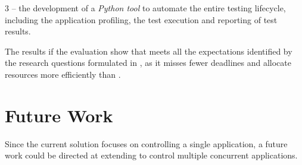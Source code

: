 3 -- the development of a \textit{Python tool} to automate the entire testing lifecycle, including the application profiling, the test execution and reporting of test results. 

The results if the evaluation show that \tool meets all the expectations identified by the research questions formulated in , as it misses fewer deadlines and allocate resources more efficiently than \cSpark. 

\section{Future Work}\label{sec:future_work}
 
Since the current solution focuses on controlling a single application, a future work could be directed at extending \tool to control multiple concurrent applications.

